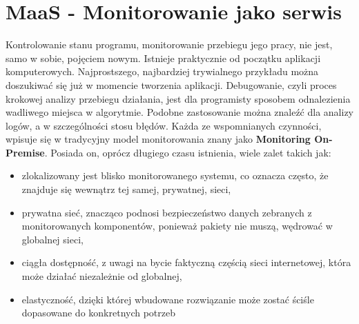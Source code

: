\section{\textbf{MaaS} - Monitorowanie jako serwis}
\label{chapter:monitoring_architecture:maas}

Kontrolowanie stanu programu, monitorowanie przebiegu jego pracy, nie jest, samo w sobie, pojęciem nowym. Istnieje praktycznie od początku 
aplikacji komputerowych. Najprostszego, najbardziej trywialnego przykładu można doszukiwać się już w momencie tworzenia aplikacji.
Debugowanie, czyli proces krokowej analizy przebiegu działania, jest dla programisty sposobem odnalezienia wadliwego miejsca w algorytmie.
Podobne zastosowanie można znaleźć dla analizy logów, a w szczególności stosu błędów. Każda ze wspomnianych czynności, wpisuje się w tradycyjny model
monitorowania znany jako \textbf{Monitoring On-Premise}. Posiada on, oprócz długiego czasu istnienia, wiele zalet takich jak:
\begin{itemize}
    \item zlokalizowany jest blisko monitorowanego systemu, co oznacza często, że znajduje się wewnątrz tej samej, prywatnej, sieci,
    \item prywatna sieć, znacząco podnosi bezpieczeństwo danych zebranych z monitorowanych komponentów, ponieważ pakiety nie muszą,
    wędrować w globalnej sieci,
    \item ciągła dostępność, z uwagi na bycie faktyczną częścią sieci internetowej, która może działać niezależnie od globalnej,
    \item elastyczność, dzięki której wbudowane rozwiązanie może zostać ściśle dopasowane do konkretnych potrzeb
\end{itemize}

